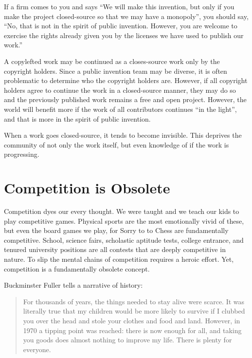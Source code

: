 \documentclass[
	fontsize=10pt, %
	twoside=false, %
	secnumdepth=1, %
]{kaobook}
\begin{document}
If a firm comes to you and says
``We will make this invention, but only
if you make the project closed-source so
that we may have a monopoly'', you should
say, ``No, that is not in the spirit of public invention.
However, you are welcome to exercise the rights
already given you by the licenses we have used to
publish our work.''

A copylefted work may be continued as a
closes-source work only by the copyright holders.
Since a public invention team may be diverse,
it is often problematic to determine who the copyright holders are.
However, if all copyright
holders agree to continue the work in a closed-source
manner, they may do so and the previously published
work remains a free and open project.
However, the world will benefit more if the
work of all contributors continues ``in the light'', and that
is more in the spirit of public invention.

When a work goes closed-source, it tends
to become invisible.
This deprives the community of not
only the work itself, but even knowledge of if the work is
progressing.

\section{Competition is Obsolete}

Competition dyes our every thought.
We were taught and we teach our kids to
play competitive games. Physical sports
are the most emotionally vivid of these,
but even the board games we play, for Sorry to
 to Chess are fundamentally
competitive.
School, science fairs, scholastic aptitude tests,
college entrance, and tenured university positions are
all contests that are deeply competitive in nature.
To slip the mental chains of competition
requires a heroic effort.
Yet, competition is
a fundamentally obsolete concept.

Buckminster Fuller tells a narrative of history:
\blockquote{
For thousands of years, the things
needed to stay alive were scarce. It was literally
true that my children would be more likely to survive
if I clubbed you over the head and stole your clothes
and food and land. However, in 1970 a tipping point
was reached: there is now enough for all, and taking
you goods does almost nothing to improve my life.
There is plenty for everyone.
}
\end{document}
